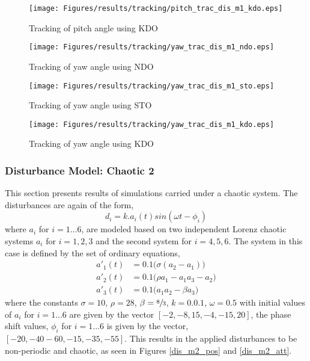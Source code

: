 \documentclass{article}
\begin{document}
\begin{figure}[H]
\centering
\texttt{[image: Figures/results/tracking/pitch\_trac\_dis\_m1\_kdo.eps]}
\caption{Tracking of pitch angle using KDO}
\label{pitch_trac_dis_m1_kdo}
\end{figure}

\begin{figure}[H]
\centering
\texttt{[image: Figures/results/tracking/yaw\_trac\_dis\_m1\_ndo.eps]}
\caption{Tracking of yaw angle using NDO}
\label{yaw_trac_dis_m1_ndo}
\end{figure}

\begin{figure}[H]
\centering
\texttt{[image: Figures/results/tracking/yaw\_trac\_dis\_m1\_sto.eps]}
\caption{Tracking of yaw angle using STO}
\label{yaw_trac_dis_m1_sto}
\end{figure}

\begin{figure}[H]
\centering
\texttt{[image: Figures/results/tracking/yaw\_trac\_dis\_m1\_kdo.eps]}
\caption{Tracking of yaw angle using KDO}
\label{yaw_trac_dis_m1_kdo}
\end{figure}

\subsubsection{Disturbance Model: Chaotic 2}
This section presents results of simulations carried under a chaotic system. The disturbances are again of the form,
\begin{equation}
d_i = k.a_i(t)sin(\omega t-\phi_i)
\label{eq:dist_2}
\end{equation}
where $a_i$ for $i=1...6$, are modeled based on two independent Lorenz chaotic systems $a_i$ for $i=1,2,3$ and the second system for $i=4,5,6$. The system in this case is defined by the set of ordinary equations, 
\begin{subequations}
\begin{align}
a'_1(t) &= 0.1\big(\sigma(a_2-a_1)\big)\\
a'_2(t) &= 0.1\big(\rho a_1 - a_1 a_3 - a_2\big)\\
a'_3(t) &= 0.1\big(a_1 a_2 - \beta a_3\big)
\end{align}
\end{subequations}
where the constants $\sigma=10$, $\rho=28$, $\beta=\sfrac{8}{3}$, $k=0.0.1$, $\omega=0.5$ with initial values of $a_i$ for $i=1...6$ are given by the vector $[-2,-8,15,-4,-15,20]$, the phase shift values, $\phi_i$ for $i=1...6$ is given by the vector, $[-20,-40-60,-15,-35,-55]$. This results in the applied disturbances to be non-periodic and chaotic, as seen in Figures \ref{dis_m2_pos} and \ref{dis_m2_att}.
\end{document}

